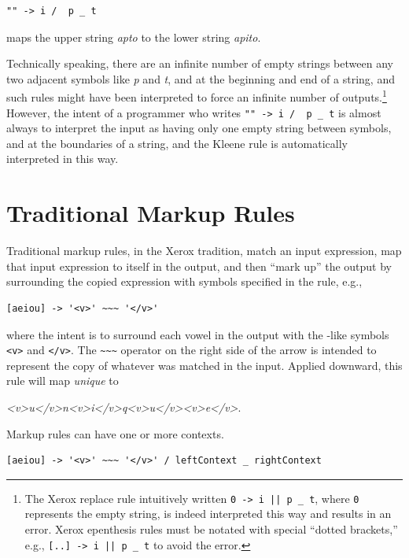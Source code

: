 \begin{Verbatim}
"" -> i /  p _ t
\end{Verbatim}

\noindent
maps the upper string \emph{apto} to the lower string \emph{apito}.  

Technically speaking, there are an infinite number
of empty strings between any two adjacent symbols like \emph{p} and \emph{t}, and at the beginning and end of a string, and such rules might have been interpreted to force
an infinite number of outputs.\footnote{The Xerox replace rule intuitively
	written \verb!0 -> i || p _ t!, where \verb!0! represents the empty
	string, is indeed interpreted this
way and results in an error.  Xerox epenthesis rules must be notated with special ``dotted brackets,'' 
e.g., \verb![..] -> i || p _ t! to avoid the error.}  However, the intent of a programmer who writes \verb!"" -> i /  p _ t! is almost always to
interpret the input as having only one empty string between symbols, and at the boundaries of a string, and the Kleene rule is automatically interpreted in this way.

\section{Traditional Markup Rules}

\label{markupRules}

Traditional markup rules, in the Xerox \xfst{} tradition, match an input expression, map that input expression to itself in the output, and then ``mark up'' the
output by surrounding the copied expression with symbols specified in
the rule, e.g.,

\begin{Verbatim}
[aeiou] -> '<v>' ~~~ '</v>'
\end{Verbatim}

\noindent
where the intent is to surround each vowel in the output with the
-like symbols \verb!<v>! and \verb!</v>!.  The \verb!~~~!
operator on the right side of the arrow is intended to represent the copy
of whatever was matched in the input.  Applied downward,
this rule will map \emph{unique} to 

\noindent
\emph{<v>u</v>n<v>i</v>q<v>u</v><v>e</v>}.

Markup rules can have one or more contexts.

\begin{Verbatim}
[aeiou] -> '<v>' ~~~ '</v>' / leftContext _ rightContext
\end{Verbatim}

